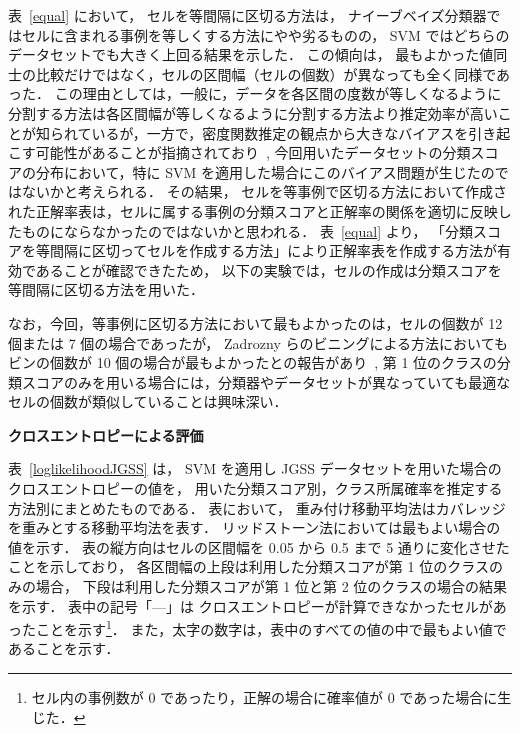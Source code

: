 \documentclass[japanese]{jnlp_1.4}
\begin{document}
表~\ref{equal} において，
セルを等間隔に区切る方法は，
ナイーブベイズ分類器ではセルに含まれる事例を等しくする方法にやや劣るものの，
SVM ではどちらのデータセットでも大きく上回る結果を示した．
この傾向は，
最もよかった値同士の比較だけではなく，セルの区間幅（セルの個数）が異なっても全く同様であった．
この理由としては，一般に，データを各区間の度数が等しくなるように分割する方法は各区間幅が等しくなるように分割する方法より推定効率が高いことが知られているが，一方で，密度関数推定の観点から大きなバイアスを引き起こす可能性があることが指摘されており~\cite{Kogure05},  
今回用いたデータセットの分類スコアの分布において，特に SVM を適用した場合にこのバイアス問題が生じたのではないかと考えられる．
その結果，
セルを等事例で区切る方法において作成された正解率表は，セルに属する事例の分類スコアと正解率の関係を適切に反映したものにならなかったのではないかと思われる．
表~\ref{equal} より，
「分類スコアを等間隔に区切ってセルを作成する方法」により正解率表を作成する方法が有効であることが確認できたため，
以下の実験では，セルの作成は分類スコアを等間隔に区切る方法を用いた．

なお，今回，等事例に区切る方法において最もよかったのは，セルの個数が 12 個または 7 個の場合であったが，
Zadrozny らのビニングによる方法においてもビンの個数が 10 個の場合が最もよかったとの報告があり~\cite{Zadrozny02}, 
第 1 位のクラスの分類スコアのみを用いる場合には，分類器やデータセットが異なっていても最適なセルの個数が類似していることは興味深い．
    \vspace{1\baselineskip}\par
    \noindent
{\bf クロスエントロピーによる評価}

表~\ref{loglikelihoodJGSS} は，
SVM を適用し JGSS データセットを用いた場合のクロスエントロピーの値を，
用いた分類スコア別，クラス所属確率を推定する方法別にまとめたものである．
表において，
重み付け移動平均法はカバレッジを重みとする移動平均法を表す．
リッドストーン法においては最もよい場合の値を示す．
表の縦方向はセルの区間幅を 0.05 から 0.5 まで 5 通りに変化させたことを示しており，
各区間幅の上段は利用した分類スコアが第 1 位のクラスのみの場合，
下段は利用した分類スコアが第 1 位と第 2 位のクラスの場合の結果を示す．
表中の記号「---」は クロスエントロピーが計算できなかったセルがあったことを示す\footnote{
	セル内の事例数が 0 であったり，正解の場合に確率値が 0 であった場合に生じた．
}．
また，太字の数字は，表中のすべての値の中で最もよい値であることを示す．

\begin{table}[b]
\begin{center}
\label{loglikelihoodJGSS}

\end{center}
\end{table}
\end{document}

